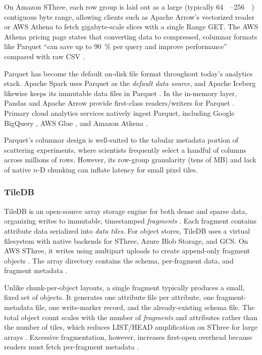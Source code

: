 \documentclass[nomenclature, english, bibtex]{kththesis}
\numberwithin{listing}{chapter}
\begin{document}
On Amazon \gls{SThree}, each row group is laid out as a large (typically \SIrange{64}{256}{\mega\byte}) contiguous byte range, allowing clients such as Apache Arrow’s vectorized reader or \gls{AWS} Athena to fetch gigabyte-scale slices with a single Range GET. The \gls{AWS} Athena pricing page states that converting data to compressed, columnar formats like Parquet “can save up to \SI{90}{\percent} per query and improve performance” compared with raw \gls{CSV} \cite{aws_athena_pricing}.

Parquet has become the default on-disk file format throughout today’s analytics stack. Apache Spark uses Parquet as the \emph{default data source}, and Apache Iceberg likewise keeps its immutable data files in Parquet \cite{iceberg_spec}. In the in-memory layer, Pandas and Apache Arrow provide first-class readers/writers for Parquet \cite{pandas_read_parquet}. Primary cloud analytics services natively ingest Parquet, including Google BigQuery \cite{bq_parquet}, \gls{AWS} Glue \cite{aws_glue_parquet}, and Amazon Athena \cite{aws-athena-columnar}.

Parquet’s columnar design is well-suited to the tabular metadata portion of scattering experiments, where scientists frequently select a handful of columns across millions of rows. However, its row-group granularity (tens of MB) and lack of native $n$-D chunking can inflate latency for small pixel tiles.


\subsubsection{TileDB}
\label{sec:tiledb}
TileDB is an open-source array storage engine for both dense and sparse data, organizing writes to immutable, timestamped \emph{fragments} \cite{Papadopoulos2016TileDB,TileDBDataLayout}. Each fragment contains attribute data serialized into \emph{data tiles}. For object stores, TileDB uses a virtual filesystem with native backends for \gls{SThree}, Azure Blob Storage, and GCS. On \gls{AWS} \gls{SThree}, it writes using multipart uploads to create append-only fragment objects \cite{TileDBBackends,TileDBS3}. The array directory contains the schema, per-fragment data, and fragment metadata \cite{TileDBFragmentMeta}.

Unlike chunk-per-object layouts, a single fragment typically produces a small, fixed set of objects. It generates one attribute file per attribute, one fragment-metadata file, one write-marker record, and the already-existing schema file. The total object count scales with the number of \emph{fragments} and attributes rather than the number of tiles, which reduces LIST/HEAD amplification on \gls{SThree} for large arrays \cite{TileDBDataLayout,TileDBFragmentMeta}. Excessive fragmentation, however, increases first-open overhead because readers must fetch per-fragment metadata \cite{TileDBConsolidateFragmentMeta}.
\end{document}
